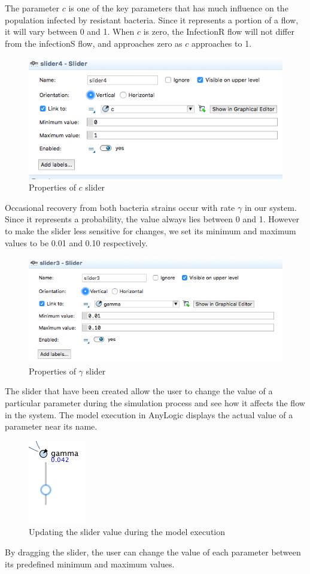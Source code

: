 The parameter $c$ is one of the key parameters that has much influence on the population infected by resistant bacteria. Since it represents a portion of a flow, it will vary between 0 and 1. When $c$ is zero, the InfectionR flow will not differ from the infectionS flow, and approaches zero as $c$ approaches to 1.

\begin{figure}[H]
  \centering
  \includegraphics[height=0.3\textwidth]{img/screens/sliders/sliders8}
  \caption{Properties of $c$ slider}
\end{figure}

Occasional recovery from both bacteria strains occur with rate $\gamma$ in our system. Since it represents a probability, the value always lies between 0 and 1. However to make the slider less sensitive for changes, we set its minimum and maximum values to be 0.01 and 0.10 respectively.

\begin{figure}[H]
  \centering
  \includegraphics[height=0.3\textwidth]{img/screens/sliders/sliders9}
  \caption{Properties of $\gamma$ slider}
\end{figure}

The slider that have been created allow the user to change the value of a particular parameter during the simulation process and see how it affects the flow in the system. The model execution in AnyLogic displays the actual value of a parameter near its name.

\begin{figure}[H]
  \centering
  \includegraphics[height=0.2\textwidth]{img/screens/sliders/sliders5}
  \caption{Updating the slider value during the model execution}
\end{figure}

By dragging the slider, the user can change the value of each parameter between its predefined minimum and maximum values.
